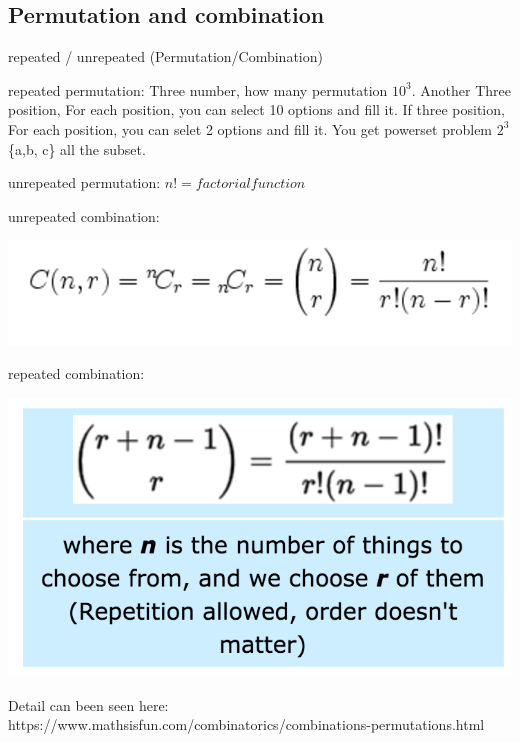 \documentclass[a4paper,11pt,twoside]{book}
\begin{document}
\subsection{Permutation and combination}

	\par repeated / unrepeated (Permutation/Combination)

	\par repeated permutation: Three number, how many permutation $10^3$. Another Three position, For each position, you can select 10 options and fill it.  If three position, For each position, you can selet 2 options and fill it. You get powerset problem $2^3$ \{a,b, c\} all the subset. 

	\par unrepeated permutation: $n! = factorial function$

	\par unrepeated combination:  
\begin{center}
	\includegraphics[scale=0.6]{pics/UC.png}
\end{center}	
 
	\par repeated combination: 
\begin{center}
	\includegraphics[scale=0.6]{pics/RC.png} 
\end{center}

	\par Detail can been seen here: https://www.mathsisfun.com/combinatorics/combinations-permutations.html
\end{document}
